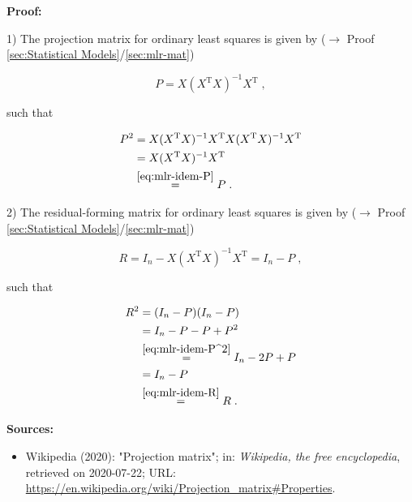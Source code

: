 \documentclass[a4paper,12pt,twoside]{book}
\begin{document}
\vspace{1em}
\textbf{Proof:}

1) The projection matrix for ordinary least squares is given by ($\rightarrow$ Proof \ref{sec:Statistical Models}/\ref{sec:mlr-mat})

\begin{equation} \label{eq:mlr-idem-P}
P = X (X^\mathrm{T} X)^{-1} X^\mathrm{T} \; ,
\end{equation}

such that

\begin{equation} \label{eq:mlr-idem-P^2}
\begin{split}
P^2 &= X (X^\mathrm{T} X)^{-1} X^\mathrm{T} X (X^\mathrm{T} X)^{-1} X^\mathrm{T} \\
&= X (X^\mathrm{T} X)^{-1} X^\mathrm{T} \\
&\overset{\eqref{eq:mlr-idem-P}}{=} P \; .
\end{split}
\end{equation}

\vspace{1em}
2) The residual-forming matrix for ordinary least squares is given by ($\rightarrow$ Proof \ref{sec:Statistical Models}/\ref{sec:mlr-mat})

\begin{equation} \label{eq:mlr-idem-R}
R = I_n - X (X^\mathrm{T} X)^{-1} X^\mathrm{T} = I_n - P \; ,
\end{equation}

such that

\begin{equation} \label{eq:mlr-idem-R^2}
\begin{split}
R^2 &= (I_n - P) (I_n - P) \\
&= I_n - P - P + P^2 \\
&\overset{\eqref{eq:mlr-idem-P^2}}{=} I_n - 2 P + P \\
&= I_n - P \\
&\overset{\eqref{eq:mlr-idem-R}}{=} R \; .
\end{split}
\end{equation}


\vspace{1em}
\textbf{Sources:}
\begin{itemize}
\item Wikipedia (2020): "Projection matrix"; in: \textit{Wikipedia, the free encyclopedia}, retrieved on 2020-07-22; URL: \url{https://en.wikipedia.org/wiki/Projection_matrix#Properties}.
\end{itemize}
\end{document}
